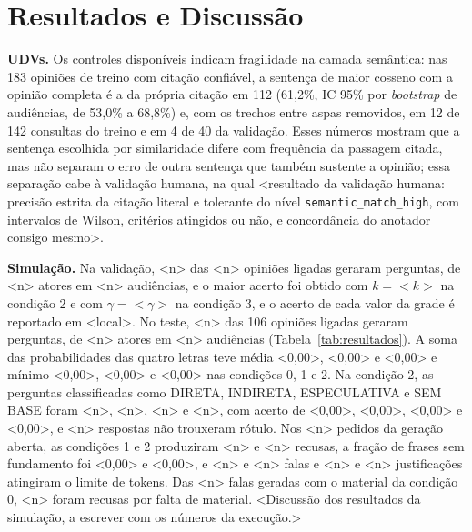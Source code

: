 \section{Resultados e Discuss\~ao}
\label{sec:resultados}

\textbf{UDVs.} Os controles disponíveis indicam fragilidade na camada semântica: nas 183 opiniões de
treino com citação confiável, a sentença de maior cosseno com a opinião completa é a da própria
citação em 112 (61,2\%, IC 95\% por \textit{bootstrap} de audiências, de 53,0\% a 68,8\%) e, com os
trechos entre aspas removidos, em 12 de 142 consultas do treino e em 4 de 40 da validação. Esses
números mostram que a sentença escolhida por similaridade difere com frequência da passagem citada,
mas não separam o erro de outra sentença que também sustente a opinião; essa separação cabe à
validação humana, na qual <resultado da validação humana: precisão estrita da citação literal e
tolerante do nível \texttt{semantic\_match\_high}, com intervalos de Wilson, critérios atingidos ou
não, e concordância do anotador consigo mesmo>.



\textbf{Simulação.} Na validação, <n> das <n> opiniões ligadas geraram perguntas, de <n> atores em
<n> audiências, e o maior acerto foi obtido com $k = {<}k{>}$ na condição 2 e com
$\gamma = {<}\gamma{>}$ na condição 3, e o acerto de cada valor da grade é reportado em <local>. No
teste, <n> das 106 opiniões ligadas geraram perguntas, de <n> atores em <n> audiências
(Tabela~\ref{tab:resultados}). A soma das probabilidades das quatro letras teve média <0,00>, <0,00>
e <0,00> e mínimo <0,00>, <0,00> e <0,00> nas condições 0, 1 e 2. Na condição 2, as perguntas classificadas como
DIRETA, INDIRETA, ESPECULATIVA e SEM BASE foram <n>, <n>, <n> e <n>, com acerto de <0,00>, <0,00>,
<0,00> e <0,00>, e <n> respostas não trouxeram rótulo. Nos <n> pedidos da geração aberta, as condições
1 e 2 produziram <n> e <n> recusas, a fração de frases sem fundamento foi <0,00> e <0,00>, e <n> e
<n> falas e <n> e <n> justificações atingiram o limite de tokens. Das <n> falas geradas com o
material da condição 0, <n> foram recusas por falta de material. <Discussão dos resultados da simulação, a escrever com os números da execução.>



